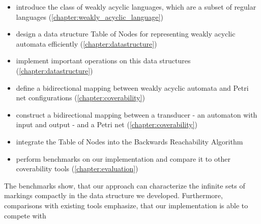 \begin{itemize}[-]
\setlength\itemsep{0.2em}
\item introduce the class of weakly acyclic languages, which are a subset of regular languages (\autoref{chapter:weakly_acyclic_language})
\item design a data structure Table of Nodes for representing weakly acyclic automata efficiently (\autoref{chapter:datastructure})
\item implement important operations on this data structures (\autoref{chapter:datastructure})
\item define a bidirectional mapping between weakly acyclic automata and Petri net configurations (\autoref{chapter:coverability})
\item construct a bidirectional mapping between a transducer - an automaton with input and output - and a Petri net (\autoref{chapter:coverability})
\item integrate the Table of Nodes into the Backwards Reachability Algorithm
\item perform benchmarks on our implementation and compare it to other coverability tools (\autoref{chapter:evaluation})
\end{itemize}

The benchmarks show, that our approach can characterize the infinite sets of markings compactly in the data structure we developed. Furthermore, comparisons with existing tools emphasize, that our implementation is able to compete with 